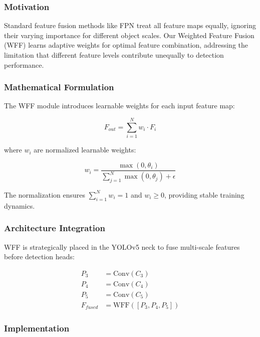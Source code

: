 \documentclass[journal]{IEEEtran}
\begin{document}
\subsubsection{Motivation}

Standard feature fusion methods like FPN treat all feature maps equally, ignoring their varying importance for different object scales. Our Weighted Feature Fusion (WFF) learns adaptive weights for optimal feature combination, addressing the limitation that different feature levels contribute unequally to detection performance.

\subsubsection{Mathematical Formulation}

The WFF module introduces learnable weights for each input feature map:

\begin{equation}
F_{out} = \sum_{i=1}^{N} w_i \cdot F_i
\end{equation}

where $w_i$ are normalized learnable weights:

\begin{equation}
w_i = \frac{\max(0, \theta_i)}{\sum_{j=1}^{N} \max(0, \theta_j) + \epsilon}
\end{equation}

The normalization ensures $\sum_{i=1}^{N} w_i = 1$ and $w_i \geq 0$, providing stable training dynamics.

\subsubsection{Architecture Integration}

WFF is strategically placed in the YOLOv5 neck to fuse multi-scale features before detection heads:

\begin{equation}
\begin{aligned}
P_3 &= \text{Conv}(C_3) \\
P_4 &= \text{Conv}(C_4) \\
P_5 &= \text{Conv}(C_5) \\
F_{fused} &= \text{WFF}([P_3, P_4, P_5])
\end{aligned}
\end{equation}

\subsubsection{Implementation}
\end{document}
